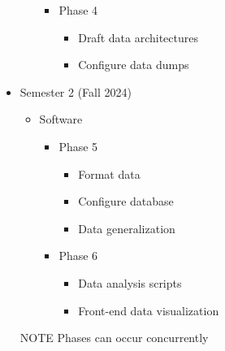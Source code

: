 \begin{itemize}
\begin{itemize}
        \begin{itemize}
            \item Phase 4
            \begin{itemize}
                \item Draft data architectures
                \item Configure data dumps                
            \end{itemize}
        \end{itemize}
    \end{itemize}
    \item Semester 2 (Fall 2024)
    \begin{itemize}
        \item Software
        \begin{itemize}
            \item Phase 5
            \begin{itemize}
                \item Format data
                \item Configure database
                \item Data generalization                
            \end{itemize}
            \item Phase 6
            \begin{itemize}
                \item Data analysis scripts
                \item Front-end data visualization                
            \end{itemize}
        \end{itemize}
    \end{itemize}
    \item[NOTE] Phases can occur concurrently
\end{itemize}
